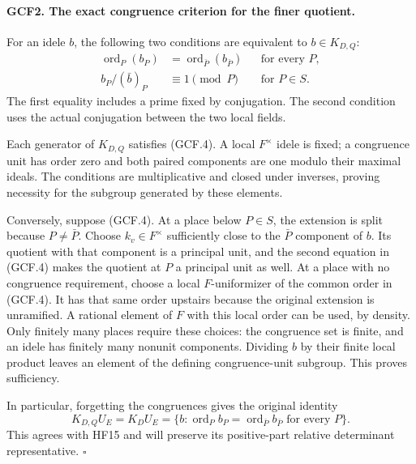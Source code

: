 \documentclass[11pt,a4paper]{article}
\numberwithin{equation}{section}
\theoremstyle{remark}\newtheorem{remark}[theorem]{Remark}
\begin{document}
\paragraph{GCF2. The exact congruence criterion for the finer quotient.}
\label{claim:GCF2}
For an idele \(b\), the following two conditions are equivalent to
\(b\in K_{D,Q}\):
\[
 \begin{aligned}
  \operatorname{ord}_P(b_P)&=
                 \operatorname{ord}_{\bar P}(b_{\bar P})
                        &&\text{for every }P,\\
  b_P/(\bar b)_P&\equiv1\pmod P &&\text{for }P\in S.
 \end{aligned}                                                   \tag{GCF.4}
\]
The first equality includes a prime fixed by conjugation.  The second
condition uses the actual conjugation between the two local fields.

Each generator of \(K_{D,Q}\) satisfies (GCF.4).  A local
\(F^{\times}\) idele is fixed; a congruence unit has order zero
and both paired components are one modulo their maximal ideals.
The conditions are multiplicative and closed under inverses, proving
necessity for the subgroup generated by these elements.

Conversely, suppose (GCF.4).  At a place below \(P\in S\), the
extension is split because \(P\ne\bar P\).  Choose
\(k_v\in F^{\times}\) sufficiently close to the \(\bar P\)
component of \(b\).  Its quotient with that component is a principal
unit, and the second equation in (GCF.4) makes the quotient at \(P\)
a principal unit as well.  At a place with no congruence requirement,
choose a local \(F\)-uniformizer of the common order in (GCF.4).
It has that same order upstairs because the original extension is
unramified.  A rational element of \(F\) with this local order can
be used, by density.  Only finitely many places require these choices:
the congruence set is finite, and an idele has finitely many nonunit
components.  Dividing \(b\) by their finite local product leaves an
element of the defining congruence-unit subgroup.  This proves
sufficiency.

In particular, forgetting the congruences gives the original identity
\[
 K_{D,Q}U_E=K_DU_E
 =\{b:\operatorname{ord}_P b_P
                  =\operatorname{ord}_{\bar P}b_{\bar P}
                    \text{ for every }P\}.             \tag{GCF.5}
\]
This agrees with HF15 and will preserve its positive-part relative
determinant representative.
\hfill\(\square\)

\end{document}
